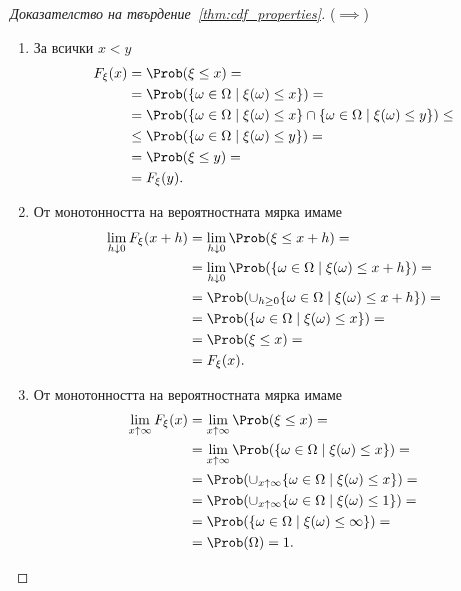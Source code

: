 \documentclass[numbers=endperiod, bibliography=totocnumbered]{scrartcl}
\begin{document}
\begin{proof}[Доказателство на твърдение~\ref{thm:cdf_properties}]
  (\( \implies \))
  \begin{enumerate}
    \item За всички \( x < y \)
    \begin{align*}
      F_\xi(x)
      &=
      \Prob(\xi \leq x)
      = \\ &=
      \Prob(\{ \omega \in \Omega \mid \xi(\omega) \leq x \})
      = \\ &=
      \Prob(\{ \omega \in \Omega \mid \xi(\omega) \leq x \} \cap \{ \omega \in \Omega \mid \xi(\omega) \leq y \})
      \leq \\ &\leq
      \Prob(\{ \omega \in \Omega \mid \xi(\omega) \leq y \})
      = \\ &=
      \Prob(\xi \leq y)
      = \\ &=
      F_\xi(y).
    \end{align*}

    \item От монотонността на вероятностната мярка имаме
    \begin{align*}
      \lim_{h \downarrow 0} F_\xi(x + h)
      &=
      \lim_{h \downarrow 0} \Prob(\xi \leq x + h)
      = \\ &=
      \lim_{h \downarrow 0} \Prob(\{ \omega \in \Omega \mid \xi(\omega) \leq x + h \})
      = \\ &=
      \Prob(\cup_{h \geq 0} \{ \omega \in \Omega \mid \xi(\omega) \leq x + h \})
      = \\ &=
      \Prob(\{ \omega \in \Omega \mid \xi(\omega) \leq x \})
      = \\ &=
      \Prob(\xi \leq x)
      = \\ &=
      F_\xi(x).
    \end{align*}

    \item От монотонността на вероятностната мярка имаме
    \begin{align*}
      \lim_{x \uparrow \infty} F_\xi(x)
      &=
      \lim_{x \uparrow \infty} \Prob(\xi \leq x)
      = \\ &=
      \lim_{x \uparrow \infty} \Prob(\{ \omega \in \Omega \mid \xi(\omega) \leq x \})
      = \\ &=
      \Prob(\cup_{x \uparrow \infty} \{ \omega \in \Omega \mid \xi(\omega) \leq x \})
      = \\ &=
      \Prob(\cup_{x \uparrow \infty} \{ \omega \in \Omega \mid \xi(\omega) \leq 1 \})
      = \\ &=
      \Prob(\{ \omega \in \Omega \mid \xi(\omega) \leq \infty \})
      = \\ &=
      \Prob(\Omega)
      =
      1.
    \end{align*}


\end{enumerate}
\end{proof}
\end{document}
